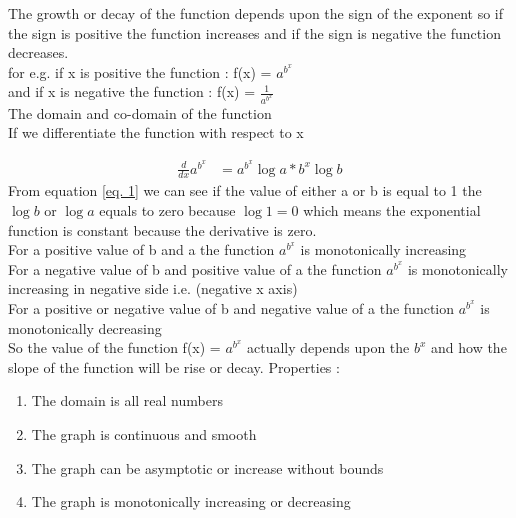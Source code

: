 \documentclass[a4paper, 11pt]{article}
\begin{document}
The growth or decay of the function depends upon the sign of the exponent so if the sign is positive the function increases and if the sign is negative the function decreases.\\

for e.g. if x is positive the function : f(x) = $a^{b^{x}}$ \\

and if x is negative the function : f(x) = $\frac{1}{a^{b^{x}}}$ \\

The domain and co-domain of the function \\

If we differentiate the function with respect to x

\begin{equation} \label{eq. 1}
    \begin{split}
        \frac{d}{dx}  a^{b^{x}} & = a^{b^{x}} \log{a} * b^x \log{b}
    \end{split}
\end{equation} 
\newline
From equation \ref{eq. 1} we can see if the value of either a or b is equal to 1 the $\log{b}$ or $\log{a}$ equals to zero because $\log{1} = 0$ which means the exponential function is constant because the derivative is zero. \\
For a positive value of b and a the function $a^{b^{x}}$ is monotonically increasing \\
For a negative value of b and positive value of a the function $a^{b^{x}}$ is monotonically increasing in negative side i.e. (negative x axis)  \\
For a positive or negative value of b and negative value of a the function $a^{b^{x}}$ is monotonically decreasing  \\

So the value of the function f(x) = $a^{b^{x}}$ actually depends upon the $b^x$  and how the slope of the function will be rise or decay. \newline
Properties : 
\begin{enumerate}
    \item The domain is all real numbers
    \item The graph is continuous and smooth
    \item The graph can be asymptotic or increase without bounds
    \item The graph is monotonically increasing or decreasing
\end{enumerate}
\end{document}
